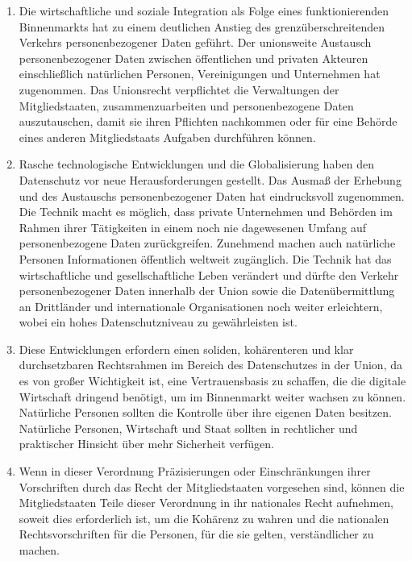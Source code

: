 \begin{enumerate}

   \item Die wirtschaftliche und soziale Integration als Folge eines funktionierenden Binnenmarkts hat zu einem
    deutlichen Anstieg des grenzüberschreitenden Verkehrs personenbezogener Daten geführt. Der unionsweite Austausch
    personenbezogener Daten zwischen öffentlichen und privaten Akteuren einschließlich natürlichen Personen,
    Vereinigungen und Unternehmen hat zugenommen. Das Unionsrecht verpflichtet die Verwaltungen der Mitgliedstaaten,
    zusammenzuarbeiten und personenbezogene Daten auszutauschen, damit sie ihren Pflichten nachkommen oder für eine
    Behörde eines anderen Mitgliedstaats Aufgaben durchführen können.%
   \label{itm:eg-5}
   

   \item Rasche technologische Entwicklungen und die Globalisierung haben den Datenschutz vor neue Herausforderungen
    gestellt. Das Ausmaß der Erhebung und des Austauschs personenbezogener Daten hat eindrucksvoll zugenommen. Die
    Technik macht es möglich, dass private Unternehmen und Behörden im Rahmen ihrer Tätigkeiten in einem noch nie
    dagewesenen Umfang auf personenbezogene Daten zurückgreifen. Zunehmend machen auch natürliche Personen
    Informationen öffentlich weltweit zugänglich. Die Technik hat das wirtschaftliche und gesellschaftliche Leben
    verändert und dürfte den Verkehr personenbezogener Daten innerhalb der Union sowie die Datenübermittlung an
    Drittländer und internationale Organisationen noch weiter erleichtern, wobei ein hohes Datenschutzniveau zu
    gewährleisten ist.%
   \label{itm:eg-6}
   

   \item Diese Entwicklungen erfordern einen soliden, kohärenteren und klar durchsetzbaren Rechtsrahmen im Bereich des
    Datenschutzes in der Union, da es von großer Wichtigkeit ist, eine Vertrauensbasis zu schaffen, die die digitale
    Wirtschaft dringend benötigt, um im Binnenmarkt weiter wachsen zu können. Natürliche Personen sollten die Kontrolle
    über ihre eigenen Daten besitzen. Natürliche Personen, Wirtschaft und Staat sollten in rechtlicher und praktischer
    Hinsicht über mehr Sicherheit verfügen.%
   \label{itm:eg-7}
   

   \item Wenn in dieser Verordnung Präzisierungen oder Einschränkungen ihrer Vorschriften durch das Recht der
    Mitgliedstaaten vorgesehen sind, können die Mitgliedstaaten Teile dieser Verordnung in ihr nationales Recht
    aufnehmen, soweit dies erforderlich ist, um die Kohärenz zu wahren und die nationalen Rechtsvorschriften für die
    Personen, für die sie gelten, verständlicher zu machen.%
   \label{itm:eg-8}
   

\end{enumerate}

